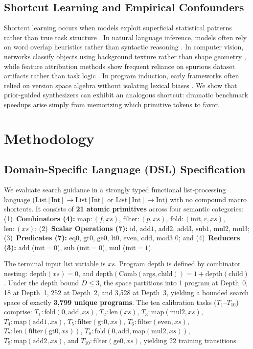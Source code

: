 \documentclass[10pt,twocolumn]{article}
\begin{document}
\subsection{Shortcut Learning and Empirical Confounders}
Shortcut learning occurs when models exploit superficial statistical patterns rather than true task structure \cite{geirhos2020shortcut, arpit2017closer}. In natural language inference, models often rely on word overlap heuristics rather than syntactic reasoning \cite{mccoy2019right, niven2019probing}. In computer vision, networks classify objects using background texture rather than shape geometry \cite{geirhos2020shortcut}, while feature attribution methods show frequent reliance on spurious dataset artifacts rather than task logic \cite{ribeiro2016why}. In program induction, early frameworks often relied on version space algebra without isolating lexical biases \cite{lau2003programming}. We show that prior-guided synthesizers can exhibit an analogous shortcut: dramatic benchmark speedups arise simply from memorizing which primitive tokens to favor.

\section{Methodology}

\subsection{Domain-Specific Language (DSL) Specification}
We evaluate search guidance in a strongly typed functional list-processing language ($\text{List}[\text{Int}] \to \text{List}[\text{Int}]$ or $\text{List}[\text{Int}] \to \text{Int}$) with no compound macro shortcuts. It consists of \textbf{21 atomic primitives} across four semantic categories: (1)~\textbf{Combinators (4):} $\text{map}: (f, xs)$, $\text{filter}: (p, xs)$, $\text{fold}: (\text{init}, r, xs)$, $\text{len}: (xs)$; (2)~\textbf{Scalar Operations (7):} $\text{id}$, $\text{add1}$, $\text{add2}$, $\text{add3}$, $\text{sub1}$, $\text{mul2}$, $\text{mul3}$; (3)~\textbf{Predicates (7):} $\text{eq0}$, $\text{gt0}$, $\text{ge0}$, $\text{lt0}$, $\text{even}$, $\text{odd}$, $\text{mod3\_0}$; and (4)~\textbf{Reducers (3):} $\text{add}$ ($\text{init}=0$), $\text{sub}$ ($\text{init}=0$), $\text{mul}$ ($\text{init}=1$).

The terminal input list variable is $xs$. Program depth is defined by combinator nesting: $\text{depth}(xs) = 0$, and $\text{depth}(\text{Comb}(\text{args}, \text{child})) = 1 + \text{depth}(\text{child})$. Under the depth bound $D \le 3$, the space partitions into 1 program at Depth~0, 18 at Depth~1, 252 at Depth~2, and 3,528 at Depth~3, yielding a bounded search space of exactly \textbf{3,799 unique programs}.
The ten calibration tasks ($T_1$--$T_{10}$) comprise: $T_1: \text{fold}(0, \text{add}, xs)$, $T_2: \text{len}(xs)$, $T_3: \text{map}(\text{mul2}, xs)$, $T_4: \text{map}(\text{add1}, xs)$, $T_5: \text{filter}(\text{gt0}, xs)$, $T_6: \text{filter}(\text{even}, xs)$, $T_7: \text{len}(\text{filter}(\text{gt0}, xs))$, $T_8: \text{fold}(0, \text{add}, \text{map}(\text{mul2}, xs))$, $T_9: \text{map}(\text{add2}, xs)$, and $T_{10}: \text{filter}(\text{ge0}, xs)$, yielding 22 training transitions.
\end{document}
